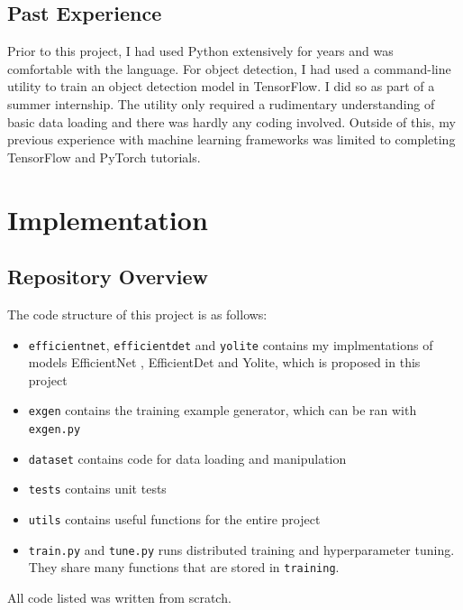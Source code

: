 \documentclass[12pt,a4paper,twoside,openany]{report}
\begin{document}
\section{Past Experience}
Prior to this project, I had used Python extensively for years and was comfortable with the language. For object detection, I had used a command-line utility to train an object detection model in TensorFlow. I did so as part of a summer internship. The utility only required a rudimentary understanding of basic data loading and there was hardly any coding involved. Outside of this, 
my previous experience with machine learning frameworks was limited to completing TensorFlow and PyTorch tutorials.

\chapter{Implementation}
\section{Repository Overview}
The code structure of this project is as follows:
\begin{center}
    
\end{center}
\begin{itemize}
    \item \verb|efficientnet|, \verb|efficientdet| and \verb|yolite| contains my implmentations of models EfficientNet \cite{tan_efficientnet_2020}, EfficientDet \cite{tan_efficientdet_2020} and Yolite, which is proposed in this project
    \item \verb|exgen| contains the training example generator, which can be ran with \verb|exgen.py|
    \item \verb|dataset| contains code for data loading and manipulation
    \item \verb|tests| contains unit tests
    \item \verb|utils| contains useful functions for the entire project
    \item \verb|train.py| and \verb|tune.py| runs distributed training and hyperparameter tuning. They share many functions that are stored in \verb|training|. 
\end{itemize}

All code listed was written from scratch. 
\end{document}
